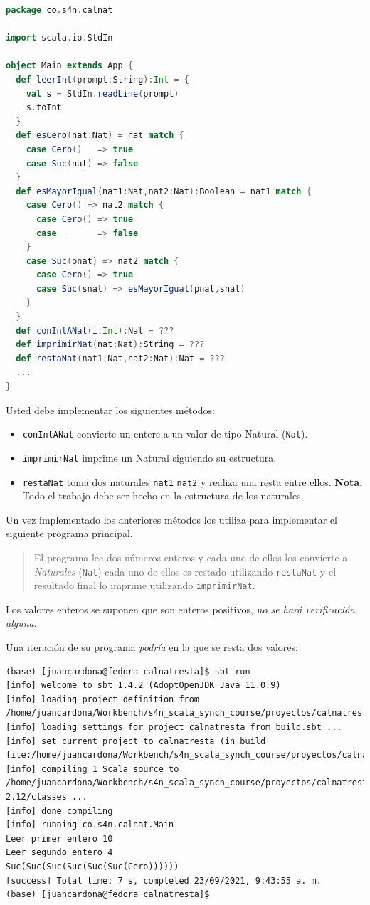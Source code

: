 \documentclass[12pt]{article}
\begin{document}
\begin{lstlisting}[language=Scala]
package co.s4n.calnat

import scala.io.StdIn

object Main extends App {
  def leerInt(prompt:String):Int = {
    val s = StdIn.readLine(prompt)
    s.toInt
  }
  def esCero(nat:Nat) = nat match {
    case Cero()   => true
    case Suc(nat) => false
  }
  def esMayorIgual(nat1:Nat,nat2:Nat):Boolean = nat1 match {
    case Cero() => nat2 match {
      case Cero() => true
      case _      => false
    }
    case Suc(pnat) => nat2 match {
      case Cero() => true
      case Suc(snat) => esMayorIgual(pnat,snat)
    }
  }
  def conIntANat(i:Int):Nat = ???
  def imprimirNat(nat:Nat):String = ???
  def restaNat(nat1:Nat,nat2:Nat):Nat = ???
  ...
}
\end{lstlisting}

Usted debe implementar los siguientes métodos:
\begin{itemize}
\item \texttt{conIntANat} convierte un entere a un valor de tipo Natural (\texttt{Nat}).
\item \texttt{imprimirNat} imprime un Natural siguiendo su estructura.
\item \texttt{restaNat} toma dos naturales \texttt{nat1} \texttt{nat2} y realiza una resta entre ellos. \textbf{Nota.} Todo el trabajo
  debe ser hecho en la estructura de los naturales.
\end{itemize}

Un vez implementado los anteriores métodos los utiliza para implementar el siguiente programa principal.

\begin{quote}
  El programa lee dos números enteros y cada uno de ellos los convierte a \emph{Naturales} (\texttt{Nat}) cada uno de ellos es
  restado utilizando \texttt{restaNat} y el resultado final lo imprime utilizando \texttt{imprimirNat}.
\end{quote}

Los valores enteros se suponen que son enteros positivos, \emph{no se hará verificación alguna}.

Una iteración de su programa \emph{podría} en la que se resta dos valores:

{\footnotesize
\begin{verbatim}
(base) [juancardona@fedora calnatresta]$ sbt run 
[info] welcome to sbt 1.4.2 (AdoptOpenJDK Java 11.0.9)
[info] loading project definition from /home/juancardona/Workbench/s4n_scala_synch_course/proyectos/calnatresta/project
[info] loading settings for project calnatresta from build.sbt ...
[info] set current project to calnatresta (in build file:/home/juancardona/Workbench/s4n_scala_synch_course/proyectos/calnatresta/)
[info] compiling 1 Scala source to /home/juancardona/Workbench/s4n_scala_synch_course/proyectos/calnatresta/target/scala-2.12/classes ...
[info] done compiling
[info] running co.s4n.calnat.Main 
Leer primer entero 10
Leer segundo entero 4
Suc(Suc(Suc(Suc(Suc(Suc(Cero))))))
[success] Total time: 7 s, completed 23/09/2021, 9:43:55 a. m.
(base) [juancardona@fedora calnatresta]$ 
\end{verbatim}
}
\end{document}
